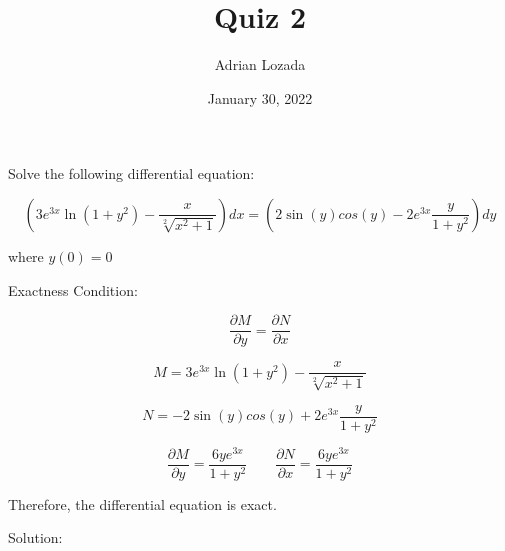 \documentclass{article}
\author{Adrian Lozada}
\title{Quiz 2}
\date{January 30, 2022}
\begin{document}
    \maketitle
    
    \newpage
    \begin{flushleft}
        Solve the following differential equation:
    \end{flushleft}

    \begin{center}
        \begin{equation}
            \left( 3e^{3x}\ln{(1+y^{2})}-\frac{x}{\sqrt[2]{x^{2}+1}} \right)dx 
            =
            \left(2\sin{(y)}cos{(y)}-2e^{3x}\frac{y}{1+y^{2}}\right)dy
        \end{equation}
    \end{center}

    \begin{flushleft}
        where $y(0)=0$
    \end{flushleft}

    \begin{flushleft}
        Exactness Condition:
    \end{flushleft}
    \begin{equation}
        \frac{\partial M}{\partial y} = \frac{\partial N}{\partial x}
    \end{equation}
    
    \begin{equation}
        M = 3e^{3x}\ln{(1+y^{2})}-\frac{x}{\sqrt[2]{x^{2}+1}}
    \end{equation}

    \begin{equation}
        N = -2\sin{(y)}cos{(y)}+2e^{3x}\frac{y}{1+y^{2}}
    \end{equation}

    \begin{equation}
        \frac{\partial M}{\partial y} = \frac{6ye^{3x}}{1+y^{2}}
        \qquad
        \frac{\partial N}{\partial x} = \frac{6ye^{3x}}{1+y^{2}}
    \end{equation}
    
    \begin{flushleft}
        Therefore, the differential equation is exact.
    \end{flushleft}

    \begin{flushleft}
        Solution:
    \end{flushleft}
    
\end{document}
